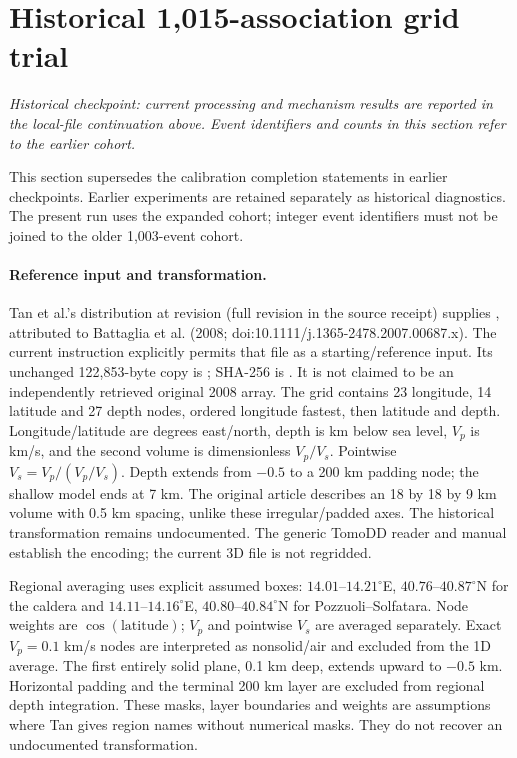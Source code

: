 \section{Historical 1,015-association grid trial}
\noindent\textit{Historical checkpoint: current processing and mechanism results are reported in the local-file continuation above. Event identifiers and counts in this section refer to the earlier cohort.}\par
This section supersedes the calibration completion statements in earlier checkpoints. Earlier experiments are retained separately as historical diagnostics. The present run uses the expanded cohort; integer event identifiers must not be joined to the older 1,003-event cohort.

\paragraph{Reference input and transformation.}
Tan et al.'s distribution at revision  (full revision in the source receipt) supplies , attributed to Battaglia et al. (2008; doi:10.1111/j.1365-2478.2007.00687.x). The current instruction explicitly permits that file as a starting/reference input. Its unchanged 122,853-byte copy is ; SHA-256 is . It is not claimed to be an independently retrieved original 2008 array. The grid contains 23 longitude, 14 latitude and 27 depth nodes, ordered longitude fastest, then latitude and depth. Longitude/latitude are degrees east/north, depth is km below sea level, $V_p$ is km/s, and the second volume is dimensionless $V_p/V_s$. Pointwise $V_s=V_p/(V_p/V_s)$. Depth extends from $-0.5$ to a 200 km padding node; the shallow model ends at 7 km. The original article describes an 18 by 18 by 9 km volume with 0.5 km spacing, unlike these irregular/padded axes. The historical transformation remains undocumented. The generic TomoDD reader and manual establish the encoding; the current 3D file is not regridded.

Regional averaging uses explicit assumed boxes: $14.01$--$14.21^\circ$E, $40.76$--$40.87^\circ$N for the caldera and $14.11$--$14.16^\circ$E, $40.80$--$40.84^\circ$N for Pozzuoli--Solfatara. Node weights are $\cos(\mathrm{latitude})$; $V_p$ and pointwise $V_s$ are averaged separately. Exact $V_p=0.1$ km/s nodes are interpreted as nonsolid/air and excluded from the 1D average. The first entirely solid plane, 0.1 km deep, extends upward to $-0.5$ km. Horizontal padding and the terminal 200 km layer are excluded from regional depth integration. These masks, layer boundaries and weights are assumptions where Tan gives region names without numerical masks. They do not recover an undocumented transformation.

